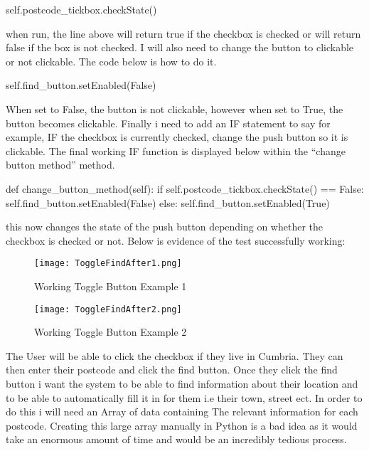 \begin{python}
self.postcode_tickbox.checkState()
\end{python}

when run, the line above will return true if the checkbox is checked or will return false if the box is not checked. I will also need to change the button to clickable or not clickable. The code below is how to do it.

\begin{python}
self.find_button.setEnabled(False)
\end{python}

When set to False, the button is not clickable, however when set to True, the button becomes clickable. Finally i need to add an IF statement to say for example, IF the checkbox is currently checked, change the push button so it is clickable. The final working IF function is displayed below within the ``change button method'' method.

\begin{python}
def change_button_method(self):
        if self.postcode_tickbox.checkState() == False:
            self.find_button.setEnabled(False)
        else:
            self.find_button.setEnabled(True)
\end{python}

this now changes the state of the push button depending on whether the checkbox is checked or not. Below is evidence of the test successfully working:

\begin{figure}[H]
\caption{Working Toggle Button Example 1} \label{fig: Results From Test 3 Example 1}
\hfill\texttt{[image: ToggleFindAfter1.png]}\hspace*{\fill}
\end{figure}

\begin{figure}[H]
\caption{Working Toggle Button Example 2} \label{fig: Results From Test 3 Example 2}
\hfill\texttt{[image: ToggleFindAfter2.png]}\hspace*{\fill}
\end{figure}

The User will be able to click the checkbox if they live in Cumbria. They can then enter their postcode and click the find button. Once they click the find button i want the system to be able to find information about their location and to be able to automatically fill it in for them i.e their town, street ect. In order to do this i will need an Array of data containing The relevant information for each postcode. Creating this large array manually in Python is a bad idea as it would take an enormous amount of time and would be an incredibly tedious process.

